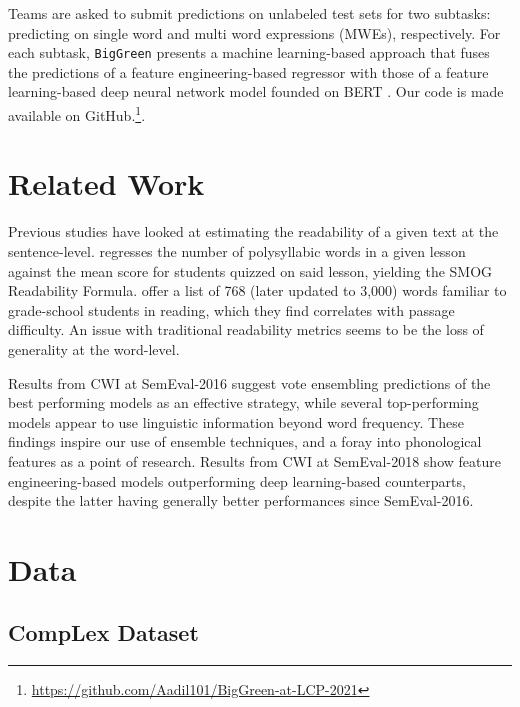 \documentclass[11pt,a4paper]{article}
\begin{document}
Teams are asked to submit predictions on unlabeled test sets for two subtasks: predicting on single word and multi word expressions (MWEs), respectively. For each subtask, \texttt{BigGreen} presents a machine learning-based approach that fuses the predictions of a feature engineering-based regressor with those of a feature learning-based deep neural network model founded on BERT \citep{DBLP:journals/corr/abs-1810-04805}. Our code is made available on GitHub.\footnote{\url{https://github.com/Aadil101/BigGreen-at-LCP-2021}}.

\section{Related Work}

Previous studies have looked at estimating the readability of a given text at the sentence-level. \citet{10.2307/40011226} regresses the number of polysyllabic words in a given lesson against the mean score for students quizzed on said lesson, yielding the SMOG Readability Formula. \citet{10.2307/1473169} offer a list of 768 (later updated to 3,000) words familiar to grade-school students in reading, which they find correlates with passage difficulty. An issue with traditional readability metrics seems to be the loss of generality at the word-level.

Results from CWI at SemEval-2016 \citep{zampieriEtAl:2017:NLPTEA} suggest vote ensembling predictions of the best performing models as an effective strategy, while several top-performing models \citep{paetzoldspecia2016sv000gg, ronzanoetal2016taln, mukherjeeetal2016ju} appear to use linguistic information beyond word frequency. These findings inspire our use of ensemble techniques, and a foray into phonological features as a point of research. Results from CWI at SemEval-2018 show feature engineering-based models outperforming deep learning-based counterparts, despite the latter having generally better performances since SemEval-2016.

\section{Data}

\subsection{CompLex Dataset}
\end{document}

